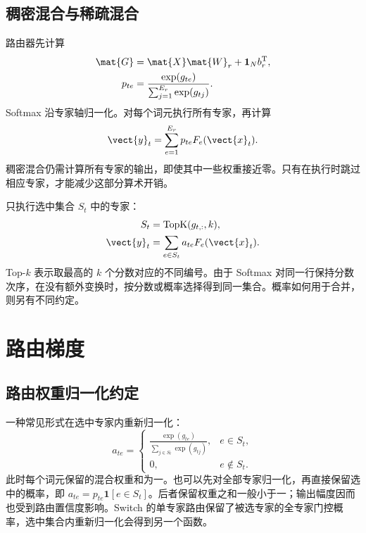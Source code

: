 \documentclass[../textbook.tex]{subfiles}
\begin{document}
\subsection{稠密混合与稀疏混合}
路由器先计算
\begin{equation}\label{eq:moe-router}
\begin{aligned}
 \mat{G} &= \mat{X}\mat{W}_r+\mathbf1_Nb_r^{\mathrm{T}}, \\
 p_{te} &= \frac{\exp(g_{te})}{\sum_{j=1}^{E_r}\exp(g_{tj})}.
\end{aligned}
\end{equation}
Softmax 沿专家轴归一化。对每个词元执行所有专家，再计算
\begin{equation}
 \vect{y}_t=\sum_{e=1}^{E_r}p_{te}F_e(\vect{x}_t).
\end{equation}
稠密混合仍需计算所有专家的输出，即使其中一些权重接近零。只有在执行时跳过相应专家，才能减少这部分算术开销。

只执行选中集合 $S_t$ 中的专家：
\begin{equation}\label{eq:moe-sparse}
\begin{aligned}
 S_t &= \operatorname{TopK}(g_{t,:},k), \\
 \vect{y}_t &= \sum_{e\in S_t}a_{te}F_e(\vect{x}_t).
\end{aligned}
\end{equation}
Top-$k$ 表示取最高的 $k$ 个分数对应的不同编号。由于 Softmax 对同一行保持分数次序，在没有额外变换时，按分数或概率选择得到同一集合。概率如何用于合并，则另有不同约定。

\section{路由梯度}

\subsection{路由权重归一化约定}
一种常见形式在选中专家内重新归一化：
\begin{equation}
 a_{te}=\begin{cases}
 \displaystyle\frac{\exp(g_{te})}{\sum_{j\in S_t}\exp(g_{tj})},&e\in S_t,\\
 0,&e\notin S_t.
 \end{cases}
 \label{eq:moe-selected-normalization}
\end{equation}
此时每个词元保留的混合权重和为一。也可以先对全部专家归一化，再直接保留选中的概率，即 $a_{te}=p_{te}\mathbf1[e\in S_t]$。后者保留权重之和一般小于一；输出幅度因而也受到路由置信度影响。Switch 的单专家路由保留了被选专家的全专家门控概率\cite{fedus2022switch}，选中集合内重新归一化会得到另一个函数。
\end{document}
